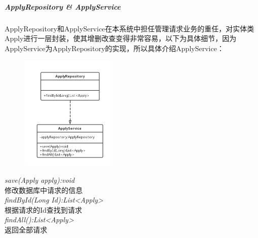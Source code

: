 \documentclass[UTF8]{ctexart}
\begin{document}
\subparagraph{ApplyRepository \& ApplyService}
ApplyRepository和ApplyService在本系统中担任管理请求业务的重任，对实体类Apply进行一层封装，使其增删改查变得非常容易，以下为具体细节，因为ApplyService为ApplyRepository的实现，所以具体介绍ApplyService：
\newline
\begin{figure}[H]
\centering
\includegraphics[width = 0.4\textwidth]{apply-rs.png}
\end{figure}
\begin{center}
\emph{save(Apply apply):void}\\
修改数据库中请求的信息\\
\emph{findById(Long Id):List<Apply>}\\
根据请求的Id查找到请求\\
\emph{findAll():List<Apply>}\\
返回全部请求
\end{center}
\end{document}
